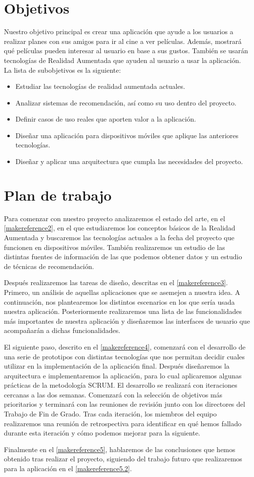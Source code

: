 \section{Objetivos}
\label{makereference1.2}
Nuestro objetivo principal es crear una aplicación que ayude a los usuarios a
realizar planes con sus amigos para ir al cine a ver películas. Además,
mostrará qué películas pueden interesar al usuario en base a sus gustos.
También se usarán tecnologías de Realidad Aumentada que ayuden al usuario a usar
la aplicación.
La lista de subobjetivos es la siguiente:
\begin{itemize}  
    \item Estudiar las tecnologías de realidad aumentada actuales.
    \item Analizar sistemas de recomendación, así como su uso dentro del
     proyecto.
    \item Definir casos de uso reales que aporten valor a la aplicación.
    \item Diseñar una aplicación para dispositivos móviles que aplique las
     anteriores tecnologías.
    \item Diseñar y aplicar una arquitectura que cumpla las necesidades del
     proyecto.
\end{itemize}

\section{Plan de trabajo}
\label{makereference1.3}

Para comenzar con nuestro proyecto analizaremos el estado del arte, en el
 \autoref{makereference2}, en el que estudiaremos los conceptos básicos de la
 Realidad Aumentada y buscaremos las tecnologías actuales a la fecha del proyecto
 que funcionen en dispositivos móviles. También realizaremos un estudio de las distintas
 fuentes de información de las que podemos obtener datos y un estudio de
 técnicas de recomendación.

Después realizaremos las tareas de diseño, descritas en el
 \autoref{makereference3}. Primero, un análisis de aquellas aplicaciones que se
 asemejen a nuestra idea. A continuación, nos plantearemos los distintos
 escenarios en los que sería usada nuestra aplicación. Posteriormente
 realizaremos una lista de las funcionalidades más importantes de nuestra
 aplicación y diseñaremos las interfaces de usuario que acompañarán a dichas
 funcionalidades. 
   
El siguiente paso, descrito en el \autoref{makereference4}, comenzará con
 el desarrollo de una serie de prototipos con distintas tecnologías que nos permitan
 decidir cuales utilizar en la implementación de la aplicación final. Después diseñaremos la
 arquitectura e implementaremos la aplicación, para lo cual aplicaremos algunas
 prácticas de la metodología SCRUM. El desarrollo se realizará con iteraciones
 cercanas a las dos semanas. Comenzará con la selección de objetivos más
 prioritarios y terminará con las reuniones de revisión junto con los directores
 del Trabajo de Fin de Grado. Tras cada iteración, los miembros del equipo
 realizaremos una reunión de retrospectiva para identificar en qué hemos fallado
 durante esta iteración y cómo podemos mejorar para la siguiente.

Finalmente en el \autoref{makereference5}, hablaremos de las conclusiones que
 hemos obtenido tras realizar el proyecto, siguiendo del trabajo futuro que realizaremos para
 la aplicación en el \autoref{makereference5.2}.

